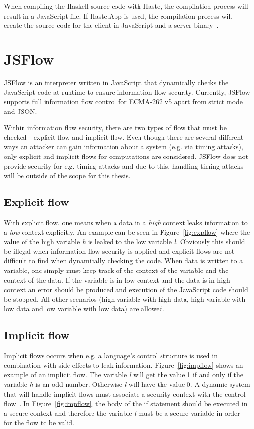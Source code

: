 When compiling the Haskell source code with Haste, the compilation process will result in a JavaScript file. If Haste.App is used, the compilation process will create the source code for the client in JavaScript and a server binary~\cite{haste-symposium}.

\section{JSFlow}
JSFlow is an interpreter written in JavaScript that dynamically checks the JavaScript code at runtime to ensure information flow security. Currently, JSFlow supports full information flow control for ECMA-262 v5 apart from strict mode and JSON.

Within information flow security, there are two types of flow that must be checked - explicit flow and implicit flow. Even though there are several different ways an attacker can gain information about a system (e.g. via timing attacks), only explicit and implicit flows for computations are considered. JSFlow does not provide security for e.g. timing attacks and due to this, handling timing attacks will be outside of the scope for this thesis.
\subsection{Explicit flow}
With explicit flow, one means when a data in a \emph{high} context leaks information to a \emph{low} context explicitly. An example can be seen in Figure~\ref{fig:expflow} where the value of the high variable \emph{h} is leaked to the low variable \emph{l}. Obviously this should be illegal when information flow security is applied and explicit flows are not difficult to find when dynamically checking the code. When data is written to a variable, one simply must keep track of the context of the variable and the context of the data. If the variable is in low context and the data is in high context an error should be produced and execution of the JavaScript code should be stopped. All other scenarios (high variable with high data, high variable with low data and low variable with low data) are allowed.
\subsection{Implicit flow}
\label{chapter:implicit_flow}
Implicit flows occurs when e.g. a language's control structure is used in combination with side effects to leak information. Figure~\ref{fig:impflow} shows an example of an implicit flow. The variable \emph{l} will get the value 1 if and only if the variable \emph{h} is an odd number. Otherwise \emph{l} will have the value 0. A dynamic system that will handle implicit flows must associate a security context with the control flow~\cite{jsflow-csf12}. In Figure~\ref{fig:impflow}, the body of the if statement should be executed in a secure context and therefore the variable \emph{l} must be a secure variable in order for the flow to be valid.

